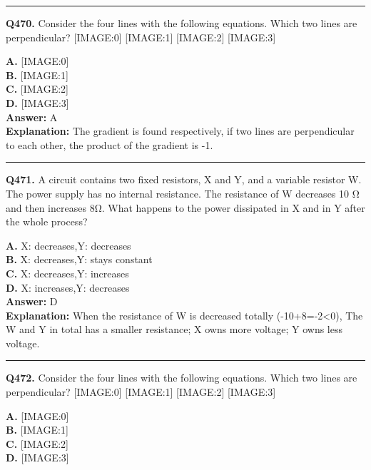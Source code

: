 \documentclass[12pt]{article}
\begin{document}
\hrule
\vspace{1em}


\noindent
\textbf{Q470.} Consider the four lines with the following equations.
Which two lines are perpendicular?
[IMAGE:0]
[IMAGE:1]
[IMAGE:2]
[IMAGE:3]



\textbf{A.} [IMAGE:0] \\
\textbf{B.} [IMAGE:1] \\
\textbf{C.} [IMAGE:2] \\
\textbf{D.} [IMAGE:3] \\

\textbf{Answer:} A \\
\textbf{Explanation:} The gradient is found respectively, if two lines are perpendicular to each other, the product of the gradient is -1.

\hrule
\vspace{1em}


\noindent
\textbf{Q471.} A circuit contains two fixed resistors, X and Y, and a variable resistor W. The power supply has no internal resistance.
The resistance of W decreases 10 Ω and then increases 8Ω. What happens to the power dissipated in X and in Y after the whole process?



\textbf{A.} X: decreases,Y: decreases \\
\textbf{B.} X: decreases,Y: stays constant \\
\textbf{C.} X: decreases,Y: increases \\
\textbf{D.} X: increases,Y: decreases \\

\textbf{Answer:} D \\
\textbf{Explanation:} When the resistance of W is decreased totally (-10+8=-2<0), The W and Y in total has a smaller resistance; X owns more voltage; Y owns less voltage.

\hrule
\vspace{1em}


\noindent
\textbf{Q472.} Consider the four lines with the following equations.
Which two lines are perpendicular?
[IMAGE:0]
[IMAGE:1]
[IMAGE:2]
[IMAGE:3]



\textbf{A.} [IMAGE:0] \\
\textbf{B.} [IMAGE:1] \\
\textbf{C.} [IMAGE:2] \\
\textbf{D.} [IMAGE:3] \\
\end{document}
